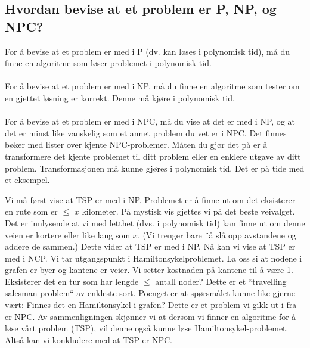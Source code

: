 \subsection{Hvordan bevise at et problem er P, NP, og NPC?}
For å bevise at et problem er med i P (dv. kan løses i polynomisk tid), må du finne en algoritme som løser problemet i polynomisk tid. 
\\\\
For å bevise at et problem er med i NP, må du finne en algoritme som tester om en gjettet løsning er korrekt. Denne må kjøre i polynomisk tid.
\\\\
For å bevise at et problem er med i NPC, må du vise at det er med i NP, og at det er minst like vanskelig som et annet problem du vet er i NPC. Det finnes bøker med lister over kjente NPC-problemer. Måten du gjør det på er å transformere det kjente problemet til ditt problem eller en enklere utgave av ditt problem. Transformasjonen må kunne gjøres i polynomisk tid. Det er på tide med et eksempel.

\begin{boxed}
Vi må først vise at TSP er med i NP. Problemet er å finne ut om det eksisterer en rute som er $\leq$ $x$ kilometer. På mystisk vis gjettes vi på det beste veivalget. Det er innlysende at vi med letthet (dvs. i polynomisk tid) kan finne ut om denne veien er kortere eller like lang som $x$. (Vi trenger bare ¨å slå opp avstandene og addere de sammen.) Dette vider at TSP er med i NP.
\newline
\newline
Nå kan vi vise at TSP er med i NCP. Vi tar utgangspunkt i Hamiltonsykelproblemet. La oss si at nodene i grafen er byer og kantene er veier. Vi setter kostnaden på kantene til å være 1. Eksisterer det en tur som har lengde $\leq$ antall noder? Dette er et ``travelling salesman problem`` av enkleste sort. Poenget er at spørsmålet kunne like gjerne vært: Finnes det en Hamiltonsykel i grafen? Dette er et problem vi gikk ut i fra er NPC.
\newline
\newline
Av sammenligningen skjønner vi at dersom vi finner en algoritme for å løse vårt problem (TSP), vil denne også kunne løse Hamiltonsykel-problemet. Altså kan vi konkludere med at TSP er NPC.
\end{boxed}